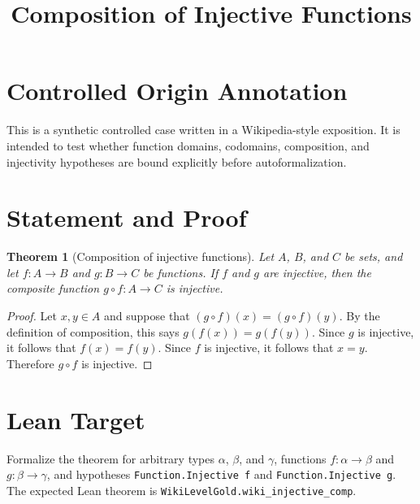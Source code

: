 \documentclass[11pt]{article}
\title{Composition of Injective Functions}
\author{}
\date{}
\newtheorem{theorem}{Theorem}
\begin{document}
\maketitle

\section*{Controlled Origin Annotation}
This is a synthetic controlled case written in a Wikipedia-style exposition.
It is intended to test whether function domains, codomains, composition, and
injectivity hypotheses are bound explicitly before autoformalization.

\section*{Statement and Proof}

\begin{theorem}[Composition of injective functions]
Let $A$, $B$, and $C$ be sets, and let $f : A \to B$ and $g : B \to C$ be
functions. If $f$ and $g$ are injective, then the composite function
$g \circ f : A \to C$ is injective.
\end{theorem}

\begin{proof}
Let $x,y \in A$ and suppose that $(g \circ f)(x) = (g \circ f)(y)$.
By the definition of composition, this says $g(f(x)) = g(f(y))$. Since $g$ is
injective, it follows that $f(x) = f(y)$. Since $f$ is injective, it follows
that $x = y$. Therefore $g \circ f$ is injective.
\end{proof}

\section*{Lean Target}
Formalize the theorem for arbitrary types $\alpha$, $\beta$, and $\gamma$,
functions $f : \alpha \to \beta$ and $g : \beta \to \gamma$, and hypotheses
\texttt{Function.Injective f} and \texttt{Function.Injective g}.
The expected Lean theorem is \texttt{WikiLevelGold.wiki\_injective\_comp}.
\end{document}

